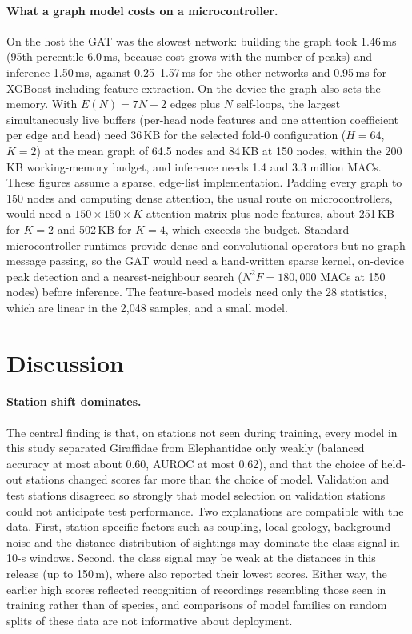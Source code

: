 \documentclass[a4paper,fleqn]{cas-dc}
\begin{document}
\paragraph{What a graph model costs on a microcontroller.} On the host the GAT was the
slowest network: building the graph took 1.46\,ms (95th percentile 6.0\,ms, because cost
grows with the number of peaks) and inference 1.50\,ms, against 0.25--1.57\,ms for the
other networks and 0.95\,ms for XGBoost including feature extraction. On the device the
graph also sets the memory. With $E(N)=7N-2$ edges plus $N$ self-loops, the largest
simultaneously live buffers (per-head node features and one attention coefficient per
edge and head) need 36\,KB for the selected fold-0 configuration ($H=64$, $K=2$) at the
mean graph of 64.5 nodes and 84\,KB at 150 nodes, within the 200\,KB working-memory
budget, and inference needs 1.4 and 3.3 million MACs. These figures assume a sparse,
edge-list implementation. Padding every graph to 150 nodes and computing dense attention,
the usual route on microcontrollers, would need a $150\times150\times K$ attention matrix
plus node features, about 251\,KB for $K=2$ and 502\,KB for $K=4$, which exceeds the
budget. Standard microcontroller runtimes provide dense and convolutional operators but
no graph message passing, so the GAT would need a hand-written sparse kernel, on-device
peak detection and a nearest-neighbour search ($N^2F=180{,}000$ MACs at 150 nodes) before
inference. The feature-based models need only the 28 statistics, which are linear in the
2,048 samples, and a small model.

\section{Discussion}\label{sec:discussion}

\paragraph{Station shift dominates.} The central finding is that, on stations not seen
during training, every model in this study separated Giraffidae from Elephantidae only
weakly (balanced accuracy at most about 0.60, AUROC at most 0.62), and that the choice of
held-out stations changed scores far more than the choice of model. Validation and test
stations disagreed so strongly that model selection on validation stations could not
anticipate test performance. Two explanations are compatible with the data. First,
station-specific factors such as coupling, local geology, background noise and the
distance distribution of sightings may dominate the class signal in 10-s windows.
Second, the class signal may be weak at the distances in this release (up to 150\,m),
where \citet{szenicer2022} also reported their lowest scores. Either way, the earlier
high scores reflected recognition of recordings resembling those seen in training rather
than of species, and comparisons of model families on random splits of these data are
not informative about deployment.
\end{document}
